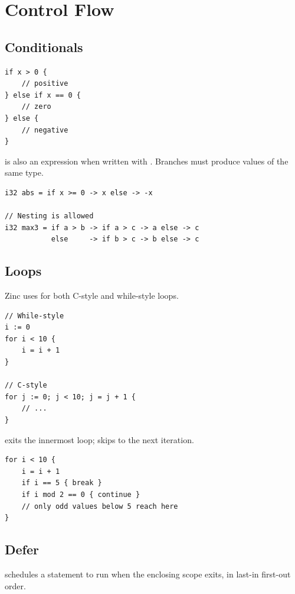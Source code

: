 \section{Control Flow}

\subsection{Conditionals}

\begin{lstlisting}[style=zinc, caption={if / else}]
if x > 0 {
    // positive
} else if x == 0 {
    // zero
} else {
    // negative
}
\end{lstlisting}

 is also an expression when written with \zn{->}.
Branches must produce values of the same type.

\begin{lstlisting}[style=zinc, caption={Inline if expression}]
i32 abs = if x >= 0 -> x else -> -x

// Nesting is allowed
i32 max3 = if a > b -> if a > c -> a else -> c
           else     -> if b > c -> b else -> c
\end{lstlisting}

\subsection{Loops}

Zinc uses  for both C-style and while-style loops.

\begin{lstlisting}[style=zinc, caption={Loop forms}]
// While-style
i := 0
for i < 10 {
    i = i + 1
}

// C-style
for j := 0; j < 10; j = j + 1 {
    // ...
}
\end{lstlisting}

 exits the innermost loop;  skips to the next iteration.

\begin{lstlisting}[style=zinc, caption={break and continue}]
for i < 10 {
    i = i + 1
    if i == 5 { break }
    if i mod 2 == 0 { continue }
    // only odd values below 5 reach here
}
\end{lstlisting}

\subsection{Defer}

 schedules a statement to run when the enclosing scope exits,
in last-in first-out order.

